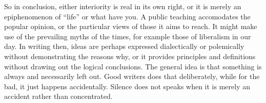 \begin{footnotesize}
\begin{sffamily}
So in conclusion, either interiority is real in its own right, or it is merely an epiphenomenon of ``life'' or what have you. A public teaching accomodates the popular opinion, or the particular views of those it aims to reach. It might make use of the prevailing myths of the times, for example those of liberalism in our day. In writing then, ideas are perhaps expressed dialectically or polemically without demonstrating the reasons why, or it provides principles and definitions without drawing out the logical conclusions. The general idea is that something is always and necessarily left out. Good writers does that deliberately, while for the bad, it just happens accidentally. Silence does not speaks when it is merely an accident rather than concentrated.

\hfill

\end{sffamily}
\end{footnotesize}

